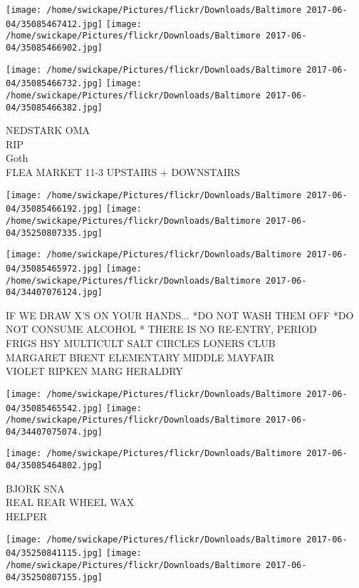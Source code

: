\documentclass[10pt,letterpaper]{article}
\begin{document}
\texttt{[image: /home/swickape/Pictures/flickr/Downloads/Baltimore 2017-06-04/35085467412.jpg]}
\texttt{[image: /home/swickape/Pictures/flickr/Downloads/Baltimore 2017-06-04/35085466902.jpg]}

\texttt{[image: /home/swickape/Pictures/flickr/Downloads/Baltimore 2017-06-04/35085466732.jpg]}
\texttt{[image: /home/swickape/Pictures/flickr/Downloads/Baltimore 2017-06-04/35085466382.jpg]}

NEDSTARK OMA\\
RIP\\
Goth\\
FLEA MARKET 11{-}3 UPSTAIRS + DOWNSTAIRS
\pagebreak

\texttt{[image: /home/swickape/Pictures/flickr/Downloads/Baltimore 2017-06-04/35085466192.jpg]}
\texttt{[image: /home/swickape/Pictures/flickr/Downloads/Baltimore 2017-06-04/35250807335.jpg]}

\texttt{[image: /home/swickape/Pictures/flickr/Downloads/Baltimore 2017-06-04/35085465972.jpg]}
\texttt{[image: /home/swickape/Pictures/flickr/Downloads/Baltimore 2017-06-04/34407076124.jpg]}

IF WE DRAW X'S ON YOUR HANDS... *DO NOT WASH THEM OFF *DO NOT CONSUME ALCOHOL * THERE IS NO RE{-}ENTRY, PERIOD\\
FRIGS HSY MULTICULT SALT CIRCLES LONERS CLUB\\
MARGARET BRENT ELEMENTARY MIDDLE MAYFAIR\\
VIOLET RIPKEN MARG HERALDRY
\pagebreak

\texttt{[image: /home/swickape/Pictures/flickr/Downloads/Baltimore 2017-06-04/35085465542.jpg]}
\texttt{[image: /home/swickape/Pictures/flickr/Downloads/Baltimore 2017-06-04/34407075074.jpg]}

\vspace{0.25in}
\texttt{[image: /home/swickape/Pictures/flickr/Downloads/Baltimore 2017-06-04/35085464802.jpg]}

BJORK SNA\\
REAL REAR WHEEL WAX\\
HELPER
\pagebreak

\texttt{[image: /home/swickape/Pictures/flickr/Downloads/Baltimore 2017-06-04/35250841115.jpg]}
\texttt{[image: /home/swickape/Pictures/flickr/Downloads/Baltimore 2017-06-04/35250807155.jpg]}
\end{document}
